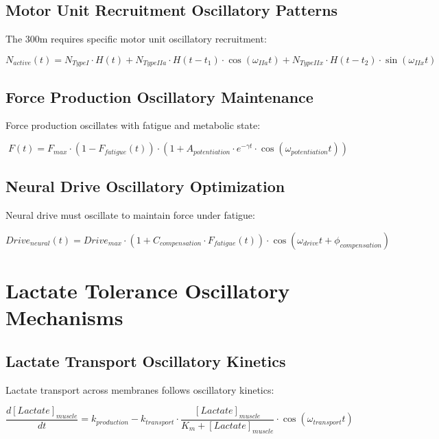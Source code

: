 \documentclass[12pt]{article}
\begin{document}
\subsection{Motor Unit Recruitment Oscillatory Patterns}

The 300m requires specific motor unit oscillatory recruitment:

\begin{equation}
N_{active}(t) = N_{Type I} \cdot H(t) + N_{Type IIa} \cdot H(t - t_1) \cdot \cos(\omega_{IIa}t) + N_{Type IIx} \cdot H(t - t_2) \cdot \sin(\omega_{IIx}t)
\end{equation}

\subsection{Force Production Oscillatory Maintenance}

Force production oscillates with fatigue and metabolic state:

\begin{equation}
F(t) = F_{max} \cdot \left(1 - F_{fatigue}(t)\right) \cdot \left(1 + A_{potentiation} \cdot e^{-\gamma t} \cdot \cos(\omega_{potentiation}t)\right)
\end{equation}

\subsection{Neural Drive Oscillatory Optimization}

Neural drive must oscillate to maintain force under fatigue:

\begin{equation}
Drive_{neural}(t) = Drive_{max} \cdot \left(1 + C_{compensation} \cdot F_{fatigue}(t)\right) \cdot \cos(\omega_{drive}t + \phi_{compensation})
\end{equation}

\section{Lactate Tolerance Oscillatory Mechanisms}

\subsection{Lactate Transport Oscillatory Kinetics}

Lactate transport across membranes follows oscillatory kinetics:

\begin{equation}
\frac{d[Lactate]_{muscle}}{dt} = k_{production} - k_{transport} \cdot \frac{[Lactate]_{muscle}}{K_m + [Lactate]_{muscle}} \cdot \cos(\omega_{transport}t)
\end{equation}
\end{document}
